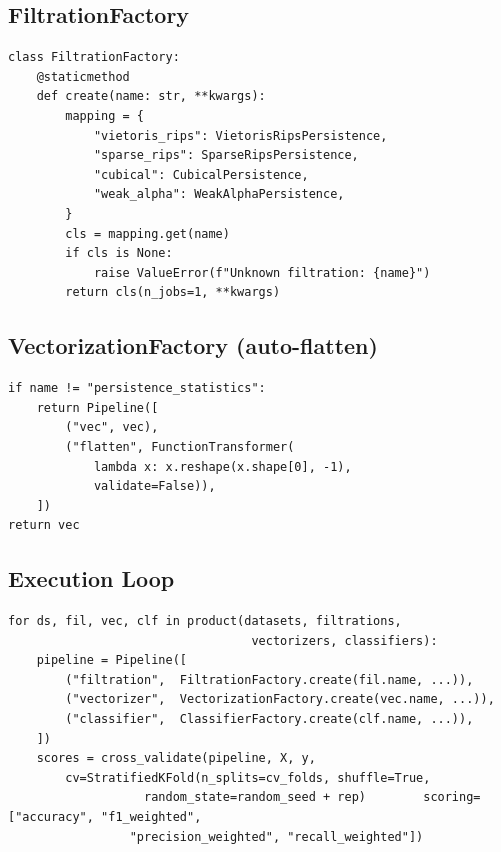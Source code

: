 \documentclass[12pt, a4paper]{report}
\theoremstyle{definition}
\theoremstyle{plain}
\theoremstyle{remark}
\begin{document}
\subsection*{FiltrationFactory}

\begin{lstlisting}[style=python, caption={FiltrationFactory.}]
class FiltrationFactory:
    @staticmethod
    def create(name: str, **kwargs):
        mapping = {
            "vietoris_rips": VietorisRipsPersistence,
            "sparse_rips": SparseRipsPersistence,
            "cubical": CubicalPersistence,
            "weak_alpha": WeakAlphaPersistence,
        }
        cls = mapping.get(name)
        if cls is None:
            raise ValueError(f"Unknown filtration: {name}")
        return cls(n_jobs=1, **kwargs)
\end{lstlisting}

\subsection*{VectorizationFactory (auto-flatten)}

\begin{lstlisting}[style=python, caption={VectorizationFactory auto-flatten.}]
if name != "persistence_statistics":
    return Pipeline([
        ("vec", vec),
        ("flatten", FunctionTransformer(
            lambda x: x.reshape(x.shape[0], -1),
            validate=False)),
    ])
return vec
\end{lstlisting}

\subsection*{Execution Loop}

\begin{lstlisting}[style=python, caption={PipelineRunner execution loop.}]
for ds, fil, vec, clf in product(datasets, filtrations,
                                  vectorizers, classifiers):
    pipeline = Pipeline([
        ("filtration",  FiltrationFactory.create(fil.name, ...)),
        ("vectorizer",  VectorizationFactory.create(vec.name, ...)),
        ("classifier",  ClassifierFactory.create(clf.name, ...)),
    ])
    scores = cross_validate(pipeline, X, y,
        cv=StratifiedKFold(n_splits=cv_folds, shuffle=True,
                   random_state=random_seed + rep)        scoring=["accuracy", "f1_weighted",
                 "precision_weighted", "recall_weighted"])
\end{lstlisting}
\end{document}
